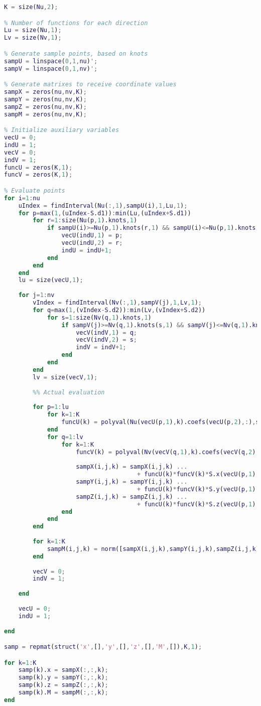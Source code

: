 	\begin{lstlisting}[language=matlab]
% Number of function sets
K = size(Nu,2);

% Number of functions for each direction
Lu = size(Nu,1);
Lv = size(Nv,1);

% Generate sample points, based on knots
sampU = linspace(0,1,nu)';
sampV = linspace(0,1,nv)';

% Generate matrixes to receive coordinate values
sampX = zeros(nu,nv,K);
sampY = zeros(nu,nv,K);
sampZ = zeros(nu,nv,K);
sampM = zeros(nu,nv,K);

% Initialize auxiliary variables
vecU = 0;
indU = 1;
vecV = 0;
indV = 1;
funcU = zeros(K,1);
funcV = zeros(K,1);

% Evaluate points
for i=1:nu
    uIndex = findInterval(Nu(:,1),sampU(i),1,Lu,1);
    for p=max(1,(uIndex-S.d1)):min(Lu,(uIndex+S.d1))
        for r=1:size(Nu(p,1).knots,1)
            if sampU(i)>=Nu(p,1).knots(r,1) && sampU(i)<=Nu(p,1).knots(r,2)
                vecU(indU,1) = p;
                vecU(indU,2) = r;
                indU = indU+1;
            end
        end
    end
    lu = size(vecU,1);
    
    for j=1:nv
        vIndex = findInterval(Nv(:,1),sampV(j),1,Lv,1);
        for q=max(1,(vIndex-S.d2)):min(Lv,(vIndex+S.d2))
            for s=1:size(Nv(q,1).knots,1)
                if sampV(j)>=Nv(q,1).knots(s,1) && sampV(j)<=Nv(q,1).knots(s,2)
                    vecV(indV,1) = q;
                    vecV(indV,2) = s;
                    indV = indV+1;
                end
            end
        end 
        lv = size(vecV,1);
        
        %% Actual evaluation
        
        for p=1:lu
            for k=1:K
                funcU(k) = polyval(Nu(vecU(p,1),k).coefs(vecU(p,2),:),sampU(i));
            end
            for q=1:lv
                for k=1:K
                    funcV(k) = polyval(Nv(vecV(q,1),k).coefs(vecV(q,2),:),sampV(j));
        
                    sampX(i,j,k) = sampX(i,j,k) ...
                                     + funcU(k)*funcV(k)*S.x(vecU(p,1),vecV(q,1));
                    sampY(i,j,k) = sampY(i,j,k) ...
                                     + funcU(k)*funcV(k)*S.y(vecU(p,1),vecV(q,1));
                    sampZ(i,j,k) = sampZ(i,j,k) ...
                                     + funcU(k)*funcV(k)*S.z(vecU(p,1),vecV(q,1));
                end
            end
        end
        
        for k=1:K
            sampM(i,j,k) = norm([sampX(i,j,k),sampY(i,j,k),sampZ(i,j,k)]);
        end
        
        vecV = 0;
        indV = 1;
        
    end
    
    vecU = 0;
    indU = 1;
    
end

samp = repmat(struct('x',[],'y',[],'z',[],'M',[]),K,1);

for k=1:K
    samp(k).x = sampX(:,:,k);
    samp(k).y = sampY(:,:,k);
    samp(k).z = sampZ(:,:,k);
    samp(k).M = sampM(:,:,k);
end
	\end{lstlisting}
	
